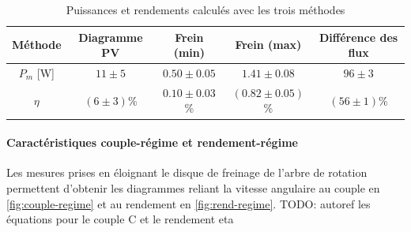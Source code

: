\begin{table}[h]
    \centering
    \begin{tabulary}{\linewidth}{C C C C C}
        \toprule
        Méthode & Diagramme PV & Frein (min) & Frein (max) & Différence des flux \\
        \midrule
        \(P_m\) [\si{\watt}] & \(11 \pm 5\) & \(0.50 \pm 0.05\) & \(1.41 \pm 0.08\) & \(96 \pm 3\) \\
        \(\eta\) & \((6 \pm 3)\)\% & \(0.10 \pm 0.03\)\% & \((0.82 \pm 0.05)\)\% & \((56 \pm 1)\)\% \\
        \bottomrule
    \end{tabulary}
    \caption{Puissances et rendements calculés avec les trois méthodes}
    \label{tab:pm_efficacite}
\end{table}

\paragraph*{Caractéristiques couple-régime et rendement-régime}
Les mesures prises en éloignant le disque de freinage de l'arbre de rotation permettent d'obtenir les diagrammes reliant la vitesse angulaire au couple en \autoref{fig:couple-regime} et au rendement en \autoref{fig:rend-regime}. TODO: autoref les équations pour le couple C et le rendement eta

